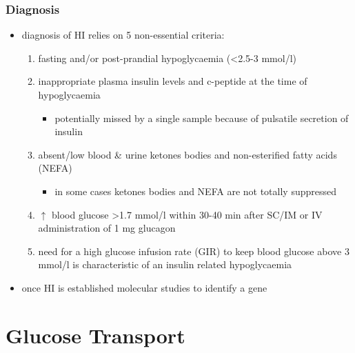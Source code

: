 \documentclass{scrartcl}
\begin{document}
\subsubsection{Diagnosis}
\label{sec:org610e3fa}
\begin{itemize}
\item diagnosis of HI relies on 5 non-essential criteria:
\begin{enumerate}
\item fasting and/or post-prandial hypoglycaemia (\textless{}2.5-3 mmol/l)
\item inappropriate plasma insulin levels and c-peptide at the time of
hypoglycaemia
\begin{itemize}
\item potentially missed by a single sample because of pulsatile
secretion of insulin
\end{itemize}
\item absent/low blood \& urine ketones bodies and non-esterified fatty
acids (NEFA)
\begin{itemize}
\item in some cases ketones bodies and NEFA are not totally
suppressed
\end{itemize}
\item \(\uparrow\) blood glucose \textgreater{}1.7 mmol/l within 30-40 min after
SC/IM or IV administration of 1 mg glucagon
\item need for a high glucose infusion rate (GIR) to keep blood
glucose above 3 mmol/l is characteristic of an insulin related
hypoglycaemia
\end{enumerate}

\item once HI is established molecular studies to identify a gene
\end{itemize}
\section{Glucose Transport}
\label{sec:org954dc35}
\end{document}
